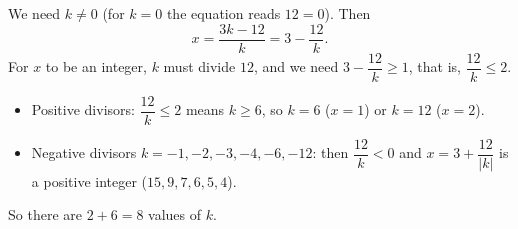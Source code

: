 We need $k\ne0$ (for $k=0$ the equation reads $12=0$). Then
\[
x=\dfrac{3k-12}{k}=3-\dfrac{12}{k}.
\]
For $x$ to be an integer, $k$ must divide $12$, and we need $3-\dfrac{12}{k}\ge1$, that is, $\dfrac{12}{k}\le2$.
\begin{itemize}
\item Positive divisors: $\dfrac{12}{k}\le2$ means $k\ge6$, so $k=6$ ($x=1$) or $k=12$ ($x=2$).
\item Negative divisors $k=-1,-2,-3,-4,-6,-12$: then $\dfrac{12}{k}<0$ and $x=3+\dfrac{12}{|k|}$ is a positive integer ($15,9,7,6,5,4$).
\end{itemize}
So there are $2+6=\boxed{8}$ values of $k$.
